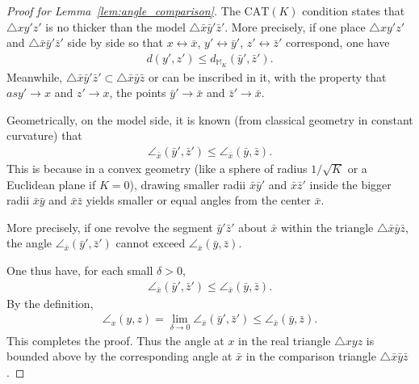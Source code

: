 \begin{proof}[Proof for Lemma~\ref{lem:angle_comparison}]
    The $\mathrm{CAT}(K)$ condition states that $\triangle x y' z'$ is no thicker than the model $\triangle \bar{x} \bar{y}' \bar{z}'$.
    More precisely, if one place $\triangle x y' z'$ and $\triangle \bar{x} \bar{y}' \bar{z}'$ side by side so that $x \leftrightarrow \bar{x}$, $y' \leftrightarrow \bar{y}'$, $z' \leftrightarrow \bar{z}'$ correspond, one have
    \begin{align*}
        d(y', z') \leq d_{\mathbb{M}_K}(\bar{y}', \bar{z}').
    \end{align*}
    Meanwhile, $\triangle\bar{x}\bar{y}'\bar{z}' \subset \triangle\bar{x}\bar{y}\bar{z}$ or can be inscribed in it, with the property that $as y' \to x$ and $z' \to x$, the points $\bar{y}' \to \bar{x}$ and $\bar{z}' \to \bar{x}$.

    Geometrically, on the model side, it is known (from classical geometry in constant curvature) that
    \begin{align}
        \angle_{\bar{x}}(\bar{y}', \bar{z}') \leq \angle_{\bar{x}}(\bar{y}, \bar{z}).
    \end{align}
    This is because in a convex geometry (like a sphere of radius $1 / \sqrt{K}$ or a Euclidean plane if $K = 0$), drawing smaller radii $\bar{x}\bar{y}'$ and $\bar{x}\bar{z}'$ inside the bigger radii $\bar{x}\bar{y}$ and $\bar{x}\bar{z}$ yields smaller or equal angles from the center $\bar{x}$.

    More precisely, if one revolve the segment $\bar{y}'\bar{z}'$ about $\bar{x}$ within the triangle $\triangle\bar{x}\bar{y}\bar{z}$, the angle $\angle_{\bar{x}}(\bar{y}', \bar{z}')$ cannot exceed $\angle_{\bar{x}}(\bar{y}, \bar{z})$.

    One thus have, for each small $\delta > 0$,
    \begin{align*}
        \angle_{\bar{x}}(\bar{y}', \bar{z}') \leq \angle_{\bar{x}}(\bar{y}, \bar{z}).
    \end{align*}
    By the definition,
    \begin{align*}
        \angle_x(y, z) = \lim_{\delta\to 0}\angle_{\bar{x}}(\bar{y}', \bar{z}') \leq \angle_{\bar{x}}(\bar{y}, \bar{z}).
    \end{align*}
    This completes the proof.
    Thus the angle at $x$ in the real triangle $\triangle xyz$ is bounded above by the corresponding angle at $\bar{x}$ in the comparison triangle $\triangle \bar{x}\bar{y}\bar{z}$.
\end{proof}

